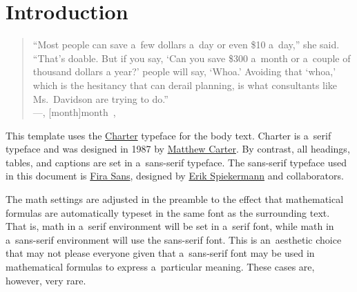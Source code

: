 


\renewcommand{\blindmarkup}[1]{\emph{#1}}
\blindmathfalse


\section{Introduction}
\label{sec:introduction}

\begin{quote}
``Most people can save a~few dollars a~day or even \$10 a~day,'' she said. ``That’s doable. But if you say, `Can you save \$300 a~month or a~couple of thousand dollars a year?' people will say, `Whoa.' Avoiding that `whoa,' which is the hesitancy that can derail planning, is what consultants like Ms.~Davidson are trying to do.'' \\
\upshape
\mbox{}\hfill---\textit{}, [month]{month}~, 
\end{quote}

%
%
%
%
%

This template uses the \href{https://en.wikipedia.org/wiki/Bitstream_Charter}{Charter} typeface for the body text. Charter is a~serif type\-face and was designed in 1987 by \href{https://en.wikipedia.org/wiki/Matthew_Carter}{Matthew Carter}. By contrast, all headings, tables, and captions are set in a~sans-serif typeface. The sans-serif typeface used in this document is \href{https://en.wikipedia.org/wiki/Fira_Sans}{Fira Sans}, designed by \href{https://en.wikipedia.org/wiki/Erik_Spiekermann}{Erik Spiekermann} and collaborators.

The math settings are adjusted in the preamble to the effect that mathematical formulas are automatically typeset in the same font as the surrounding text. That is, math in a~serif environment will be set in a~serif font, while math in a~sans-serif environment will use the sans-serif font. This is an~aesthetic choice that may not please everyone given that a~sans-serif font may be used in mathematical formulas to express a~particular meaning. These cases are, however, very rare.


